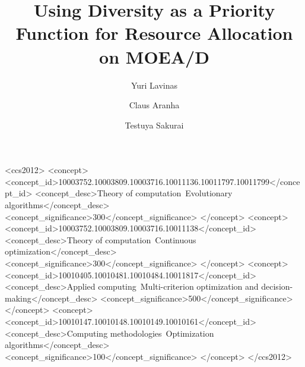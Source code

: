 \documentclass[sigconf, authordraft, anonymous]{acmart}
\begin{document}
\title{Using Diversity as a Priority Function for Resource Allocation on MOEA/D}

\author{Yuri Lavinas}

\author{Claus Aranha}

\author{Testuya Sakurai}


%
\begin{abstract}
	
\end{abstract}


\begin{CCSXML}
	<ccs2012>
	<concept>
	<concept_id>10003752.10003809.10003716.10011136.10011797.10011799</concept_id>
	<concept_desc>Theory of computation~Evolutionary algorithms</concept_desc>
	<concept_significance>300</concept_significance>
	</concept>
	<concept>
	<concept_id>10003752.10003809.10003716.10011138</concept_id>
	<concept_desc>Theory of computation~Continuous optimization</concept_desc>
	<concept_significance>300</concept_significance>
	</concept>
	<concept>
	<concept_id>10010405.10010481.10010484.10011817</concept_id>
	<concept_desc>Applied computing~Multi-criterion optimization and decision-making</concept_desc>
	<concept_significance>500</concept_significance>
	</concept>
	<concept>
	<concept_id>10010147.10010148.10010149.10010161</concept_id>
	<concept_desc>Computing methodologies~Optimization algorithms</concept_desc>
	<concept_significance>100</concept_significance>
	</concept>
	</ccs2012>
\end{CCSXML}
\end{document}
